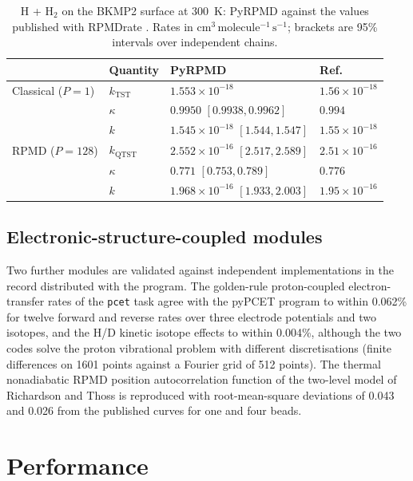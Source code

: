 \documentclass[preprint,12pt]{elsarticle}
\newcommand{\code}[1]{\texttt{#1}}
\newcommand{\rateunit}{\mathrm{cm^{3}\,molecule^{-1}\,s^{-1}}}
\begin{document}
\begin{table}[!htbp]
\caption{H + H$_2$ on the BKMP2 surface at 300~K: PyRPMD against the values published with RPMDrate \cite{rpmrate13}. Rates in $\rateunit$; brackets are 95\% intervals over independent chains.}
\label{tab:h3}
\small
\begin{tabular*}{\textwidth}{@{\extracolsep{\fill}}llll@{}}
\toprule
 & Quantity & PyRPMD & Ref.~\cite{rpmrate13} \\
\midrule
Classical ($P=1$) & $k_{\mathrm{TST}}$ & $1.553\times10^{-18}$ & $1.56\times10^{-18}$ \\
 & $\kappa$ & $0.9950$ $[0.9938,0.9962]$ & $0.994$ \\
 & $k$ & $1.545\times10^{-18}$ $[1.544,1.547]$ & $1.55\times10^{-18}$ \\
RPMD ($P=128$) & $k_{\mathrm{QTST}}$ & $2.552\times10^{-16}$ $[2.517,2.589]$ & $2.51\times10^{-16}$ \\
 & $\kappa$ & $0.771$ $[0.753,0.789]$ & $0.776$ \\
 & $k$ & $1.968\times10^{-16}$ $[1.933,2.003]$ & $1.95\times10^{-16}$ \\
\bottomrule
\end{tabular*}
\end{table}

\subsection{Electronic-structure-coupled modules}

Two further modules are validated against independent implementations in the record distributed with the program. The golden-rule proton-coupled electron-transfer rates of the \code{pcet} task agree with the pyPCET program \cite{pypcet2025} to within 0.062\% for twelve forward and reverse rates over three electrode potentials and two isotopes, and the H/D kinetic isotope effects to within 0.004\%, although the two codes solve the proton vibrational problem with different discretisations (finite differences on 1601 points against a Fourier grid of 512 points). The thermal nonadiabatic RPMD position autocorrelation function of the two-level model of Richardson and Thoss \cite{na-nrpmd2013} is reproduced with root-mean-square deviations of 0.043 and 0.026 from the published curves for one and four beads.

\section{Performance}
\label{sec:performance}
\end{document}
